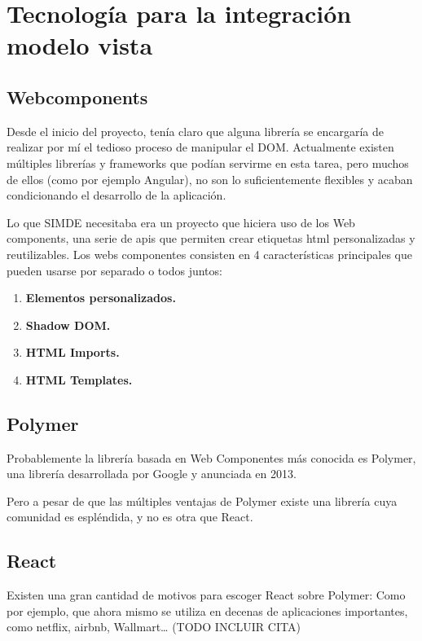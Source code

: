 \section{Tecnología para la integración modelo vista}
\label{3:sec2}

\subsection{Webcomponents}

Desde el inicio del proyecto, tenía claro que alguna librería se encargaría de realizar 
por mí el tedioso proceso de manipular el DOM. Actualmente existen múltiples librerías 
y frameworks que podían servirme en esta tarea, pero muchos de ellos (como por ejemplo Angular),
 no son lo suficientemente flexibles y acaban condicionando el desarrollo de la aplicación.

\bigskip
Lo que SIMDE necesitaba era un proyecto que hiciera uso de los Web components, 
una serie de apis que permiten crear etiquetas html personalizadas y reutilizables. 
Los webs componentes consisten en 4 características principales que pueden usarse 
por separado o todos juntos:

\begin{enumerate}

\item \textbf{Elementos personalizados.}
\item \textbf{Shadow DOM.}
\item \textbf{HTML Imports.}
\item \textbf{HTML Templates.}

\end{enumerate}

\subsection{Polymer}
Probablemente la librería basada en Web Componentes más conocida es Polymer,
una librería desarrollada por Google y anunciada en 2013. 

\bigskip

Pero a pesar de que las múltiples ventajas de Polymer existe una librería cuya comunidad es espléndida,
 y no es otra que React.

\subsection{React}
Existen una gran cantidad de motivos para escoger React sobre Polymer: Como por ejemplo, 
que ahora mismo se utiliza en decenas de aplicaciones importantes, como netflix, airbnb, Wallmart… (TODO INCLUIR CITA)

